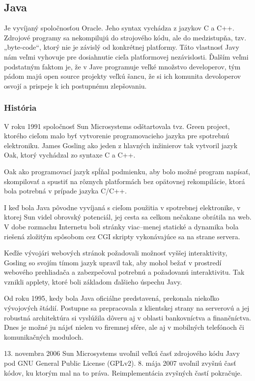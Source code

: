 \subsection{Java}
\indent Je vyvíjaný spoločnosťou Oracle. Jeho syntax vychádza z jazykov C a C++. Zdrojové programy sa nekompilujú do strojového kódu, ale do medzistupňa, tzv. „byte-code“, ktorý nie je závislý od konkrétnej platformy. Táto vlastnosť Javy nám veľmi vyhovuje pre dosiahnutie cieľa platformovej nezávislosti. Ďalším veľmi podstatným faktom je, že v Jave programuje veľké množstvo developerov, tým pádom majú open source projekty veľkú šancu, že si ich komunita devoloperov osvojí a prispeje k ich postupnému zlepšovaniu.

\subsubsection{História}
V roku 1991 spoločnosť Sun Microsystems odštartovala tvz. Green project, ktorého cieľom malo byť vytvorenie programovacieho jazyka pre spotrebnú elektroniku. James Gosling ako jeden z hlavných inžinierov tak vytvoril jazyk Oak, ktorý vychádzal zo syntaxe C a C++.

Oak ako programovací jazyk spĺňal podmienku, aby bolo možné program napísať, skompilovať a spustiť na rôznych platformách bez opätovnej rekompilácie, ktorá bola potrebná v prípade jazyka C/C++.

I keď bola Java pôvodne vyvíjaná s cieľom použitia v spotrebnej elektronike, v ktorej Sun videl obrovský potenciál, jej cesta sa celkom nečakane obrátila na web. V dobe rozmachu Internetu boli stránky viac–menej statické a dynamika bola riešená zložitým spôsobom cez CGI skripty vykonávajúce sa na strane servera.

Keďže vývojári webových stránok požadovali možnosť vyššej interaktivity, Gosling so svojím tímom jazyk upravil tak, aby mohol bežať v prostredí webového prehliadača a zabezpečoval potrebnú a požadovanú interaktivitu. Tak vznikli applety, ktoré boli základom ďalšieho úspechu Javy.

Od roku 1995, kedy bola Java oficiálne predstavená, prekonala niekoľko vývojových štádií. Postupne sa prepracovala z klientskej strany na serverovú a jej robustná architektúra si vyslúžila dôveru aj v oblasti bankovníctva a finančníctva. Dnes je možné ju nájsť nielen vo firemnej sfére, ale aj v mobilných telefónoch či komunikačných moduloch.

13. novembra 2006 Sun Microsystems uvoľnil veľkú časť zdrojového kódu Javy pod GNU General Public License (GPLv2). 8. mája 2007 uvoľnil zvyšnú časť kódov, ku ktorým mal na to práva. Reimplementácia zvyšných častí pokračuje.

